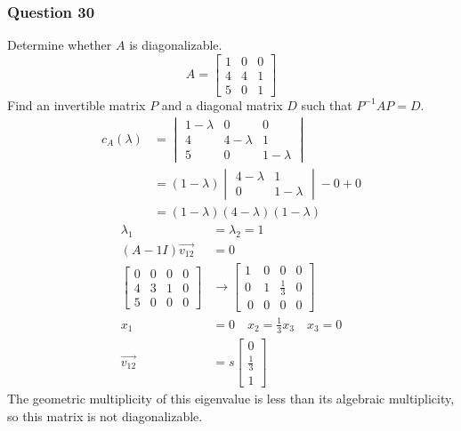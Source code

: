 \documentclass{math}
\begin{document}
\subsubsection*{Question 30}
Determine whether \( A \) is diagonalizable.
\[ A = \begin{bmatrix}
  1 & 0 & 0 \\
  4 & 4 & 1 \\
  5 & 0 & 1
\end{bmatrix} \]
Find an invertible matrix \( P \) and a diagonal matrix \( D \) such that
\( P^{-1}AP = D \).
\begin{align*}
  c_A(\lambda) &= \begin{vmatrix}
    1-\lambda & 0 & 0 \\
    4 & 4-\lambda & 1 \\
    5 & 0 & 1-\lambda
  \end{vmatrix} \\
  &= (1-\lambda)\begin{vmatrix}
    4-\lambda & 1 \\
    0 & 1-\lambda
  \end{vmatrix}-0+0 \\
  &= (1-\lambda)(4-\lambda)(1-\lambda)
\end{align*}
\begin{align*}
  \lambda_1 &= \lambda_2 = 1 \\
  (A-1I)\vec{v_{12}} &= 0 \\
  \begin{bmatrix}
    0 & 0 & 0 & 0 \\
    4 & 3 & 1 & 0 \\
    5 & 0 & 0 & 0
  \end{bmatrix} &\to \begin{bmatrix}
    1 & 0 & 0 & 0 \\
    0 & 1 & \frac{1}{3} & 0 \\\
    0 & 0 & 0 & 0
  \end{bmatrix} \\
  x_1 &= 0 \quad x_2 = \frac{1}{3}x_3 \quad x_3 = 0 \\
  \vec{v_{12}} &= s\begin{bmatrix}0 \\ \frac{1}{3} \\ 1\end{bmatrix}
\end{align*}
The geometric multiplicity of this eigenvalue is less than its algebraic
multiplicity, so this matrix is not diagonalizable.
\end{document}

